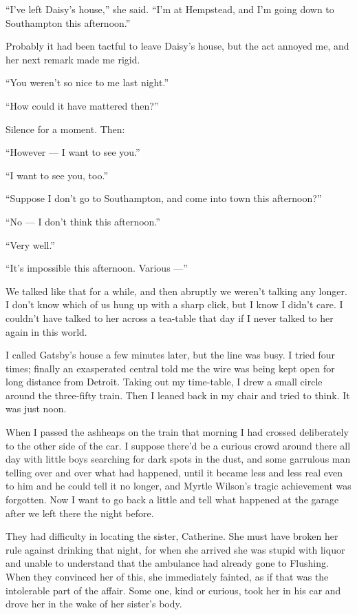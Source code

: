 \documentclass{znotebook}
\begin{document}
``I've left Daisy's house,'' she said. ``I'm at Hempstead, and I'm going down to Southampton this afternoon.''

Probably it had been tactful to leave Daisy's house, but the act annoyed me, and her next remark made me rigid.

``You weren't so nice to me last night.''

``How could it have mattered then?''

Silence for a moment. Then:

``However ---{} I want to see you.''

``I want to see you, too.''

``Suppose I don't go to Southampton, and come into town this afternoon?''

``No ---{} I don't think this afternoon.''

``Very well.''

``It's impossible this afternoon. Various ---''

We talked like that for a while, and then abruptly we weren't talking any longer. I don't know which of us hung up with a sharp click, but I know I didn't care. I couldn't have talked to her across a tea-table that day if I never talked to her again in this world.

I called Gatsby's house a few minutes later, but the line was busy. I tried four times; finally an exasperated central told me the wire was being kept open for long distance from Detroit. Taking out my time-table, I drew a small circle around the three-fifty train. Then I leaned back in my chair and tried to think. It was just noon.

When I passed the ashheaps on the train that morning I had crossed deliberately to the other side of the car. I suppose there'd be a curious crowd around there all day with little boys searching for dark spots in the dust, and some garrulous man telling over and over what had happened, until it became less and less real even to him and he could tell it no longer, and Myrtle Wilson's tragic achievement was forgotten. Now I want to go back a little and tell what happened at the garage after we left there the night before.

They had difficulty in locating the sister, Catherine. She must have broken her rule against drinking that night, for when she arrived she was stupid with liquor and unable to understand that the ambulance had already gone to Flushing. When they convinced her of this, she immediately fainted, as if that was the intolerable part of the affair. Some one, kind or curious, took her in his car and drove her in the wake of her sister's body.
\end{document}
